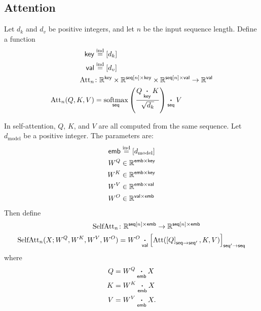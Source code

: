 \documentclass{article}
\newcommand{\dmodel}{d_{\text{model}}}
\begin{document}
\subsection{Attention}

Let $d_k$ and $d_v$ be positive integers, and let $n$ be the input sequence length. Define a function
\begin{align*}
  \name{key} &\ndef [d_k] \\
  \name{val} &\ndef [d_v] \\
  \text{Att}_n &\colon \mathbb{R}^{\name{key}} \times \mathbb{R}^{\nset{seq}{n} \times\name{key}} \times \mathbb{R}^{\nset{seq}{n} \times\name{val}} \rightarrow \mathbb{R}^{\name{val}} \\
  \text{Att}_n(Q,K,V) &= \nfun{seq}{softmax} \left( \frac{Q \ndot{key} K}{\sqrt{d_k}} \right) \ndot{seq} V
\end{align*}

In self-attention, $Q$, $K$, and $V$ are all computed from the same sequence.  Let $\dmodel$ be a positive integer. The parameters are:
\begin{align*}
  \name{emb} &\ndef [\dmodel] \\
  W^Q &\in \mathbb{R}^{\name{emb} \times \name{key}} \\
  W^K &\in \mathbb{R}^{\name{emb} \times \name{key}} \\
  W^V &\in \mathbb{R}^{\name{emb} \times \name{val}} \\
  W^O &\in \mathbb{R}^{\name{val} \times \name{emb}}
\end{align*}
Then define
\begin{align*}
  \text{SelfAtt}_n &\colon \mathbb{R}^{\nset{seq}{n} \times\name{emb}} \rightarrow \mathbb{R}^{\nset{seq}{n} \times\name{emb}} \\
  \text{SelfAtt}_n(X; W^Q, W^K, W^V, W^O) &= W^O \ndot{val} \nmov{seq'}{seq}{\text{Att}(\nmov{seq}{seq'}{Q}, K, V)}
\end{align*}
where
\begin{align*}
  Q &= W^Q \ndot{emb} X \\
  K &= W^K \ndot{emb} X \\
  V &= W^V \ndot{emb} X.
\end{align*}
\end{document}
